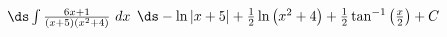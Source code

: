 {$\ds \int \frac{6x+1}{(x+5)\left(x^2+4\right)}\ dx$}
{$\ds -\ln |x+5|+\frac{1}{2}\ln\left(x^2+4\right)+\frac{1}{2}\tan^{-1}\left(\frac{x}{2}\right)+C$}
